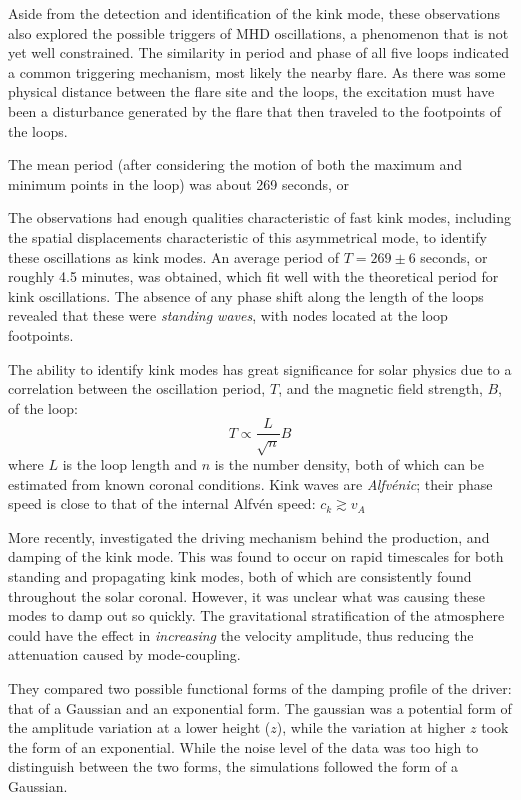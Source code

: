 \documentclass[preprint2]{aastex}
\begin{document}
Aside from the detection and identification of the kink mode,
these observations also explored the possible triggers of MHD
oscillations, a phenomenon that is not yet well constrained. The
similarity in period and phase of all five loops indicated a common
triggering mechanism, most likely the nearby flare. As there was some
physical distance between the flare site and the loops, the excitation
must have been a disturbance generated by the flare that then
traveled to the footpoints of the loops.

The mean period (after considering the
motion of both the maximum and minimum points in the loop) was
about 269 seconds, or

The observations had enough qualities characteristic of
fast kink modes, including the spatial displacements characteristic
of this asymmetrical mode, to identify these oscillations as kink
modes.
An average period of $T = 269 \pm 6$ seconds, or
roughly 4.5 minutes, was obtained, which fit well with the theoretical
period for kink oscillations.
The absence of any phase
shift along the length of the loops revealed that these were
\emph{standing waves}, with nodes located at the loop footpoints.

The ability to identify kink modes has great significance
for solar physics due to a correlation between the oscillation period,
$T$, and the magnetic field strength, $B$, of the loop:
\begin{equation}
    T \propto \frac{L}{\sqrt{n}}{B}
\end{equation}
where $L$ is the loop length and $n$ is the number density,
both of which can be estimated from known coronal conditions.
Kink waves are \emph{Alfv\'enic}; their phase speed is
close to that of the internal Alfv\'en speed:
$c_{k} \gtrsim v_{A}   $

More recently, \cite{kink_2} investigated the driving mechanism
behind the production, and damping of the kink mode.
This was found to occur on rapid timescales for both standing
and propagating kink modes, both of which are consistently found
throughout the solar coronal.
However, it was unclear what was causing
these modes to damp out so quickly.
The gravitational stratification of the atmosphere could have
the effect in \emph{increasing} the velocity amplitude, thus
reducing the attenuation caused by mode-coupling.

They compared two possible functional forms of the damping profile
of the driver: that of a Gaussian and an exponential form.
The gaussian was a potential form of the amplitude variation at a
lower height ($z$), while the variation at higher $z$ took the
form of an exponential.
While the noise level of the data was too high to distinguish
between the two forms, the simulations followed the form of a
Gaussian.
\end{document}
